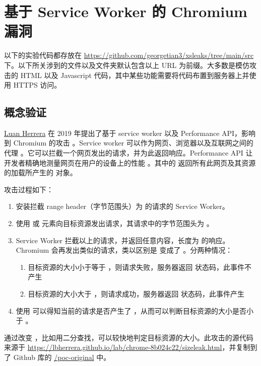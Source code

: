 \section{基于 Service Worker 的 Chromium 漏洞}

以下的实验代码都存放在 \url{https://github.com/georgetian3/xsleaks/tree/main/src} 下。以下所关涉到的文件以及文件夹默认包含以上 URL 为前缀。大多数是模仿攻击的 HTML 以及 Javascript 代码，其中某些功能需要将代码布置到服务器上并使用 HTTPS 访问。

\subsection{概念验证}

\href{https://blog.lbherrera.me/}{Luan Herrera} 在 2019 年提出了基于 service worker 以及 Performance API，影响到 Chromium 的攻击 \cite{herrera}。Service worker 可以作为网页、浏览器以及互联网之间的代理 \cite{sw} 。它可以拦截一个网页发出的请求，并为此返回响应。Performance API 让开发者精确地测量网页在用户的设备上的性能 \cite{papi}。其中的  返回所有此网页及其资源的加载所产生的  对象。

攻击过程如下：

\begin{enumerate}
    \item 安装拦截 range header（字节范围头）为  的请求的 Service Worker。
    \item 使用  或  元素向目标资源发出请求，其请求中的字节范围头为 。
    \item Service Worker 拦截以上的请求，并返回任意内容，长度为  的响应。Chromium 会再发出类似的请求，类以区别是  变成了 。分两种情况：
    \begin{enumerate}
        \item 目标资源的大小小于等于 ，则请求失败，服务器返回  状态码，此事件不产生 
        \item 目标资源的大小大于 ，则请求成功，服务器返回  状态码，此事件产生 
    \end{enumerate}
    \item 使用  可以得知当前的请求是否产生了 ，从而可以判断目标资源的大小是否小于 。
\end{enumerate}

通过改变 ，比如用二分查找，可以较快地判定目标资源的大小。此攻击的源代码来源于 \url{https://lbherrera.github.io/lab/chrome-8b024c22/sizeleak.html}，并复制到了 Github 库的 \href{https://github.com/georgetian3/xsleaks/tree/main/src/poc-original}{/poc-original} 中。

